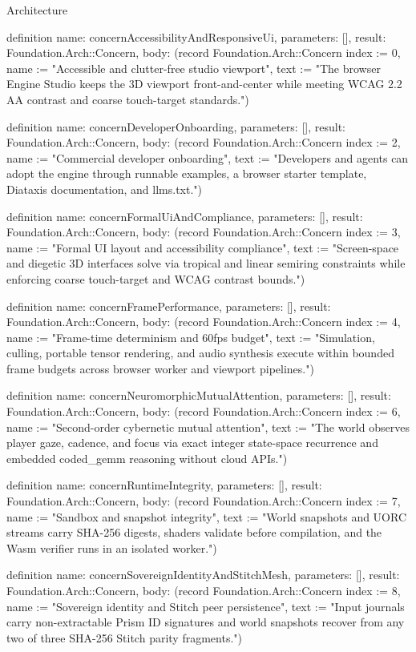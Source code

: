 \begin{lexlean}{Architecture}
\begin{semanticmodule}
definition{
  name: concernAccessibilityAndResponsiveUi,
  parameters: [],
  result: Foundation.Arch::Concern,
  body: (record Foundation.Arch::Concern {index := 0, name := "Accessible and clutter-free studio viewport", text := "The browser Engine Studio keeps the 3D viewport front-and-center while meeting WCAG 2.2 AA contrast and coarse touch-target standards."})
}

definition{
  name: concernDeveloperOnboarding,
  parameters: [],
  result: Foundation.Arch::Concern,
  body: (record Foundation.Arch::Concern {index := 2, name := "Commercial developer onboarding", text := "Developers and agents can adopt the engine through runnable examples, a browser starter template, Diataxis documentation, and llms.txt."})
}

definition{
  name: concernFormalUiAndCompliance,
  parameters: [],
  result: Foundation.Arch::Concern,
  body: (record Foundation.Arch::Concern {index := 3, name := "Formal UI layout and accessibility compliance", text := "Screen-space and diegetic 3D interfaces solve via tropical and linear semiring constraints while enforcing coarse touch-target and WCAG contrast bounds."})
}

definition{
  name: concernFramePerformance,
  parameters: [],
  result: Foundation.Arch::Concern,
  body: (record Foundation.Arch::Concern {index := 4, name := "Frame-time determinism and 60fps budget", text := "Simulation, culling, portable tensor rendering, and audio synthesis execute within bounded frame budgets across browser worker and viewport pipelines."})
}

definition{
  name: concernNeuromorphicMutualAttention,
  parameters: [],
  result: Foundation.Arch::Concern,
  body: (record Foundation.Arch::Concern {index := 6, name := "Second-order cybernetic mutual attention", text := "The world observes player gaze, cadence, and focus via exact integer state-space recurrence and embedded coded_gemm reasoning without cloud APIs."})
}

definition{
  name: concernRuntimeIntegrity,
  parameters: [],
  result: Foundation.Arch::Concern,
  body: (record Foundation.Arch::Concern {index := 7, name := "Sandbox and snapshot integrity", text := "World snapshots and UORC streams carry SHA-256 digests, shaders validate before compilation, and the Wasm verifier runs in an isolated worker."})
}

definition{
  name: concernSovereignIdentityAndStitchMesh,
  parameters: [],
  result: Foundation.Arch::Concern,
  body: (record Foundation.Arch::Concern {index := 8, name := "Sovereign identity and Stitch peer persistence", text := "Input journals carry non-extractable Prism ID signatures and world snapshots recover from any two of three SHA-256 Stitch parity fragments."})
}


\end{semanticmodule}
\end{lexlean}
